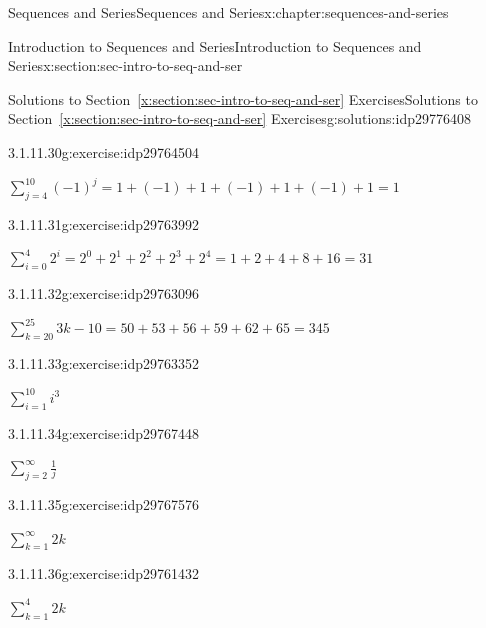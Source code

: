 \documentclass[twoside,10pt,]{book}
\newcommand{\xreffont}{\relax}
\numberwithin{equation}{section}
\begin{document}
\begin{chapterptx}{Sequences and Series}{}{Sequences and Series}{}{}{x:chapter:sequences-and-series}
\begin{sectionptx}{Introduction to Sequences and Series}{}{Introduction to Sequences and Series}{}{}{x:section:sec-intro-to-seq-and-ser}
\begin{solutions-subsection}{Solutions to Section~{\xreffont\ref*{x:section:sec-intro-to-seq-and-ser}} Exercises}{}{Solutions to Section~{\xreffont\ref*{x:section:sec-intro-to-seq-and-ser}} Exercises}{}{}{g:solutions:idp29776408}
\begin{exercisegroup}
\begin{divisionsolutioneg}{3.1.11.30}{}{g:exercise:idp29764504}%
\par\smallskip%
\noindent\hypertarget{g:solution:idp29766168-main}{}\(\sum\limits_{j = 4}^{10} {{{\left( { - 1} \right)}^j}}  = 1 + \left( { - 1} \right) + 1 + \left( { - 1} \right) + 1 + \left( { - 1} \right) + 1 = 1\)\end{divisionsolutioneg}%
\begin{divisionsolutioneg}{3.1.11.31}{}{g:exercise:idp29763992}%
\par\smallskip%
\noindent\hypertarget{g:solution:idp29761304-main}{}\(\sum\limits_{i = 0}^4 {{2^i}}  = {2^0} + {2^1} + {2^2} + {2^3} + {2^4} = 1 + 2 + 4 + 8 + 16 = 31\)\end{divisionsolutioneg}%
\begin{divisionsolutioneg}{3.1.11.32}{}{g:exercise:idp29763096}%
\par\smallskip%
\noindent\hypertarget{g:solution:idp29765912-main}{}\(\sum\limits_{k = 20}^{25} {3k - 10}  = 50 + 53 + 56 + 59 + 62 + 65 = 345\)\end{divisionsolutioneg}%
\end{exercisegroup}
\par\medskip\noindent
\begin{exercisegroup}
\begin{divisionsolutioneg}{3.1.11.33}{}{g:exercise:idp29763352}%
\par\smallskip%
\noindent\hypertarget{g:solution:idp29766680-main}{}\(\sum\limits_{i = 1}^{10} i^3 \)\end{divisionsolutioneg}%
\begin{divisionsolutioneg}{3.1.11.34}{}{g:exercise:idp29767448}%
\par\smallskip%
\noindent\hypertarget{g:solution:idp29764888-main}{}\(\sum\limits_{j = 2}^{\infty}  \frac{1}{j}\)\end{divisionsolutioneg}%
\begin{divisionsolutioneg}{3.1.11.35}{}{g:exercise:idp29767576}%
\par\smallskip%
\noindent\hypertarget{g:solution:idp29767960-main}{}\(\sum\limits_{k = 1}^{\infty} 2k\)\end{divisionsolutioneg}%
\begin{divisionsolutioneg}{3.1.11.36}{}{g:exercise:idp29761432}%
\par\smallskip%
\noindent\hypertarget{g:solution:idp29774232-main}{}\(\sum\limits_{k = 1}^4 2k\)\end{divisionsolutioneg}%

\end{exercisegroup}
\end{solutions-subsection}
\end{sectionptx}
\end{chapterptx}
\end{document}
